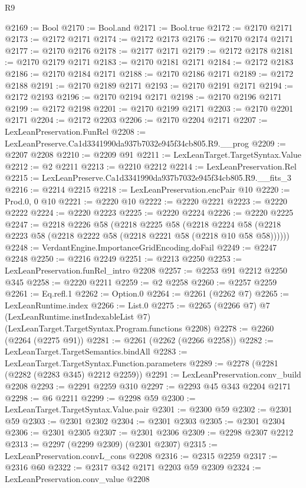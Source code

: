 \begin{lexlean}{R9}
\begin{coremodule}
@2169 := Bool
@2170 := Bool.and
@2171 := Bool.true
@2172 := @2170 @2171
@2173 := @2172 @2171
@2174 := @2172 @2173
@2176 := @2170 @2174 @2171
@2177 := @2170 @2176
@2178 := @2177 @2171
@2179 := @2172 @2178
@2181 := @2170 @2179 @2171
@2183 := @2170 @2181 @2171
@2184 := @2172 @2183
@2186 := @2170 @2184 @2171
@2188 := @2170 @2186 @2171
@2189 := @2172 @2188
@2191 := @2170 @2189 @2171
@2193 := @2170 @2191 @2171
@2194 := @2172 @2193
@2196 := @2170 @2194 @2171
@2198 := @2170 @2196 @2171
@2199 := @2172 @2198
@2201 := @2170 @2199 @2171
@2203 := @2170 @2201 @2171
@2204 := @2172 @2203
@2206 := @2170 @2204 @2171
@2207 := LexLeanPreservation.FunRel
@2208 := LexLeanPreserve.Ca1d3341990da937b7032e945f34cb805.R9.__prog
@2209 := @2207 @2208
@2210 := @2209 @91
@2211 := LexLeanTarget.TargetSyntax.Value
@2212 := @2 @2211
@2213 := @2210 @2212
@2214 := LexLeanPreservation.Rel
@2215 := LexLeanPreserve.Ca1d3341990da937b7032e945f34cb805.R9.__fits_3
@2216 := @2214 @2215
@2218 := LexLeanPreservation.encPair @10
@2220 := Prod.{0, 0} @10
@2221 := @2220 @10
@2222 := @2220 @2221
@2223 := @2220 @2222
@2224 := @2220 @2223
@2225 := @2220 @2224
@2226 := @2220 @2225
@2247 := @2218
    @2226
    @58
    (@2218
      @2225
      @58
      (@2218 @2224 @58 (@2218 @2223 @58 (@2218 @2222 @58 (@2218 @2221 @58 (@2218 @10 @58 @58))))))
@2248 := VerdantEngine.ImportanceGridEncoding.doFail
@2249 := @2247 @2248
@2250 := @2216 @2249
@2251 := @2213 @2250
@2253 := LexLeanPreservation.funRel_intro @2208
@2257 := @2253 @91 @2212 @2250 @345
@2258 := @2220 @2211
@2259 := @2 @2258
@2260 := @2257 @2259
@2261 := Eq.refl.{1}
@2262 := Option.{0}
@2264 := @2261 (@2262 @7)
@2265 := LexLeanRuntime.index
@2266 := List.{0}
@2275 := @2265
    (@2266 @7)
    @7
    (LexLeanRuntime.instIndexableList @7)
    (LexLeanTarget.TargetSyntax.Program.functions @2208)
@2278 := @2260 (@2264 (@2275 @91))
@2281 := @2261 (@2262 (@2266 @2258))
@2282 := LexLeanTarget.TargetSemantics.bindAll
@2283 := LexLeanTarget.TargetSyntax.Function.parameters
@2289 := @2278 (@2281 (@2282 (@2283 @345) @2212 @2259))
@2291 := LexLeanPreservation.conv_build @2208
@2293 := @2291 @2259 @310
@2297 := @2293 @45 @343 @2204 @2171
@2298 := @6 @2211
@2299 := @2298 @59
@2300 := LexLeanTarget.TargetSyntax.Value.pair
@2301 := @2300 @59
@2302 := @2301 @59
@2303 := @2301 @2302
@2304 := @2301 @2303
@2305 := @2301 @2304
@2306 := @2301 @2305
@2307 := @2301 @2306
@2309 := @2298 @2307 @2212
@2313 := @2297 (@2299 @2309) (@2301 @2307)
@2315 := LexLeanPreservation.convL_cons @2208
@2316 := @2315 @2259
@2317 := @2316 @60
@2322 := @2317 @342 @2171 @2203 @59 @2309
@2324 := LexLeanPreservation.conv_value @2208

\end{coremodule}
\end{lexlean}
